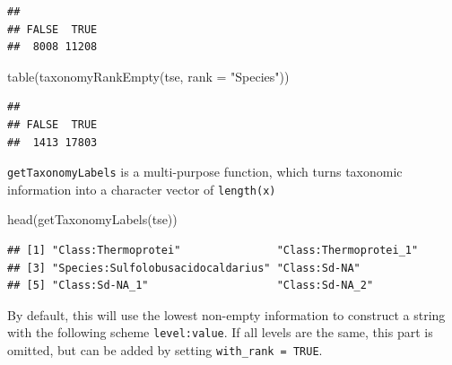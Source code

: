 \documentclass[
]{book}
\newenvironment{Shaded}{\begin{snugshade}}{\end{snugshade}}
\newcommand{\AttributeTok}[1]{\textcolor[rgb]{0.77,0.63,0.00}{#1}}
\newcommand{\DecValTok}[1]{\textcolor[rgb]{0.00,0.00,0.81}{#1}}
\newcommand{\FunctionTok}[1]{\textcolor[rgb]{0.00,0.00,0.00}{#1}}
\newcommand{\NormalTok}[1]{#1}
\newcommand{\OtherTok}[1]{\textcolor[rgb]{0.56,0.35,0.01}{#1}}
\newcommand{\SpecialCharTok}[1]{\textcolor[rgb]{0.00,0.00,0.00}{#1}}
\newcommand{\StringTok}[1]{\textcolor[rgb]{0.31,0.60,0.02}{#1}}
\begin{document}
\begin{verbatim}
## 
## FALSE  TRUE 
##  8008 11208
\end{verbatim}

\begin{Shaded}
\begin{Highlighting}[]
\FunctionTok{table}\NormalTok{(}\FunctionTok{taxonomyRankEmpty}\NormalTok{(tse, }\AttributeTok{rank =} \StringTok{"Species"}\NormalTok{))}
\end{Highlighting}
\end{Shaded}

\begin{verbatim}
## 
## FALSE  TRUE 
##  1413 17803
\end{verbatim}

\texttt{getTaxonomyLabels} is a multi-purpose function, which turns taxonomic
information into a character vector of \texttt{length(x)}

\begin{Shaded}
\begin{Highlighting}[]
\FunctionTok{head}\NormalTok{(}\FunctionTok{getTaxonomyLabels}\NormalTok{(tse))}
\end{Highlighting}
\end{Shaded}

\begin{verbatim}
## [1] "Class:Thermoprotei"               "Class:Thermoprotei_1"            
## [3] "Species:Sulfolobusacidocaldarius" "Class:Sd-NA"                     
## [5] "Class:Sd-NA_1"                    "Class:Sd-NA_2"
\end{verbatim}

By default, this will use the lowest non-empty information to construct a
string with the following scheme \texttt{level:value}. If all levels are the same,
this part is omitted, but can be added by setting \texttt{with\_rank\ =\ TRUE}.

\begin{Shaded}
\end{Shaded}
\end{document}
